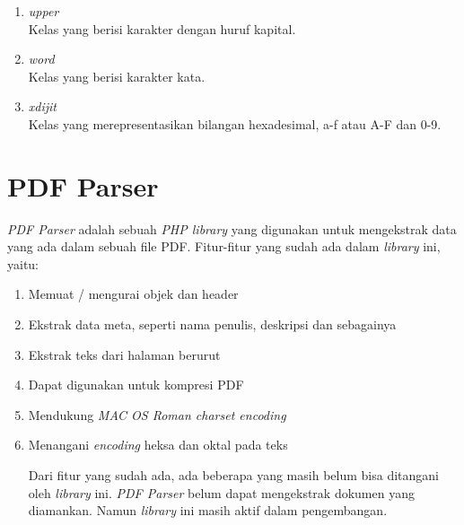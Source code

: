 \begin{enumerate}
	\item \textit{upper} \\
	Kelas yang berisi karakter dengan huruf kapital.
	
	\item \textit{word} \\
	Kelas yang berisi karakter kata.
	
	\item \textit{xdijit} \\
	Kelas yang merepresentasikan bilangan hexadesimal, a-f atau A-F dan 0-9.
	
\end{enumerate}

\section{PDF Parser}

\textit{PDF Parser} adalah sebuah \textit{PHP library} yang digunakan untuk mengekstrak data yang ada dalam sebuah file PDF. Fitur-fitur yang sudah ada dalam \textit{library} ini, yaitu:

\begin{enumerate}
	\item Memuat / mengurai objek dan header
	\item Ekstrak data meta, seperti nama penulis, deskripsi dan sebagainya
	\item Ekstrak teks dari halaman berurut
	\item Dapat digunakan untuk kompresi PDF
	\item Mendukung \textit{MAC OS Roman charset encoding}
	\item Menangani \textit{encoding} heksa dan oktal pada teks

Dari fitur yang sudah ada, ada beberapa yang masih belum bisa ditangani oleh \textit{library} ini. \textit{PDF Parser}  belum dapat mengekstrak dokumen yang diamankan. Namun \textit{library} ini  masih aktif dalam pengembangan.
	
\end{enumerate}
